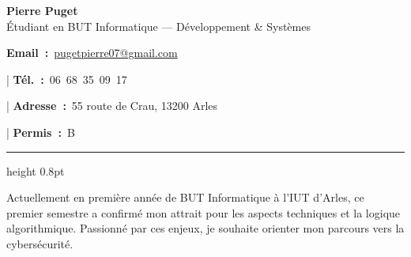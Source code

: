 \documentclass[11pt, a4paper]{article}
\newcommand{\cvcontact}[2]{%
    \textbf{#1}~#2
}
\begin{document}
\begin{center}
    {\Huge\bfseries Pierre Puget}\\[4pt]
    {\large\color{muted}Étudiant en BUT Informatique --- Développement \& Systèmes}\\[8pt]
    {\small
        \cvcontact{Email~:}{\href{mailto:pugetpierre07@gmail.com}{pugetpierre07@gmail.com}}
        \quad\textcolor{rule}{|}\quad
        \cvcontact{Tél.~:}{06~68~35~09~17}
        \quad\textcolor{rule}{|}\quad
        \cvcontact{Adresse~:}{55 route de Crau, 13200 Arles}
        \quad\textcolor{rule}{|}\quad
        \cvcontact{Permis~:}{B}
    }
\end{center}
\vspace{4pt}
{\color{rule}\hrule height 0.8pt}
\vspace{10pt}

\RaggedRight
Actuellement en première année de BUT Informatique à l'IUT d'Arles, ce premier semestre a confirmé mon attrait pour les aspects techniques et la logique algorithmique. Passionné par ces enjeux, je souhaite orienter mon parcours vers la cybersécurité.
\end{document}
